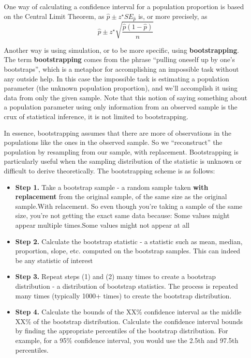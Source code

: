 \documentclass[
]{article}
\providecommand{\tightlist}{%
  \setlength{\itemsep}{0pt}\setlength{\parskip}{0pt}}
\begin{document}
One way of calculating a confidence interval for a population proportion
is based on the Central Limit Theorem, as
\(\hat{p} \pm z^\star SE_{\hat{p}}\) is, or more precisely, as
\[ \hat{p} \pm z^\star \sqrt{ \frac{\hat{p} (1-\hat{p})}{n} } \]

Another way is using simulation, or to be more specific, using
\textbf{bootstrapping}. The term \textbf{bootstrapping} comes from the
phrase ``pulling oneself up by one's bootstraps'', which is a metaphor
for accomplishing an impossible task without any outside help. In this
case the impossible task is estimating a population parameter (the
unknown population proportion), and we'll accomplish it using data from
only the given sample. Note that this notion of saying something about a
population parameter using only information from an observed sample is
the crux of statistical inference, it is not limited to bootstrapping.

In essence, bootstrapping assumes that there are more of observations in
the populations like the ones in the observed sample. So we
``reconstruct'' the population by resampling from our sample, with
replacement. Bootstrapping is particularly useful when the sampling
distribution of the statistic is unknown or difficult to derive
theoretically. The bootstrapping scheme is as follows:

\begin{itemize}
\tightlist
\item
  \textbf{Step 1.} Take a bootstrap sample - a random sample taken
  \textbf{with replacement} from the original sample, of the same size
  as the original sample.With relacement. So even though you're taking a
  sample of the same size, you're not getting the exact same data
  because: Some values might appear multiple times.Some values might not
  appear at all
\item
  \textbf{Step 2.} Calculate the bootstrap statistic - a statistic such
  as mean, median, proportion, slope, etc. computed on the bootstrap
  samples. This can indeed be any statistic of interest
\item
  \textbf{Step 3.} Repeat steps (1) and (2) many times to create a
  bootstrap distribution - a distribution of bootstrap statistics. The
  process is repeated many times (typically 1000+ times) to create the
  bootstrap distribution.
\item
  \textbf{Step 4.} Calculate the bounds of the XX\% confidence interval
  as the middle XX\% of the bootstrap distribution. Calculate the
  confidence interval bounds by finding the appropriate percentiles of
  the bootstrap distribution. For example, for a 95\% confidence
  interval, you would use the 2.5th and 97.5th percentiles.
\end{itemize}
\end{document}
